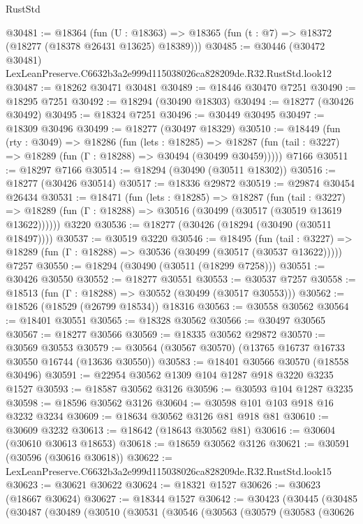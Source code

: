 \begin{lexlean}{RustStd}
\begin{coremodule}
@30481 := @18364
    (fun (U : @18363) => @18365 (fun (t : @7) => @18372 (@18277 (@18378 @26431 @13625) @18389)))
@30485 := @30446
    (@30472 @30481)
    LexLeanPreserve.C6632b3a2e999d115038026ca828209de.R32.RustStd.look12
@30487 := @18262 @30471 @30481
@30489 := @18446 @30470 @7251
@30490 := @18295 @7251
@30492 := @18294 (@30490 @18303)
@30494 := @18277 (@30426 @30492)
@30495 := @18324 @7251
@30496 := @30449 @30495
@30497 := @18309 @30496
@30499 := @18277 (@30497 @18329)
@30510 := @18449
    (fun (rty : @3049) =>
    @18286
      (fun (lets : @18285) =>
      @18287 (fun (tail : @3227) => @18289 (fun (Γ : @18288) => @30494 (@30499 @30459)))))
    @7166
@30511 := @18297 @7166
@30514 := @18294 (@30490 (@30511 @18302))
@30516 := @18277 (@30426 @30514)
@30517 := @18336 @29872
@30519 := @29874 @30454 @26434
@30531 := @18471
    (fun (lets : @18285) =>
    @18287
      (fun (tail : @3227) =>
      @18289 (fun (Γ : @18288) => @30516 (@30499 (@30517 (@30519 @13619 @13622))))))
    @3220
@30536 := @18277 (@30426 (@18294 (@30490 (@30511 @18497))))
@30537 := @30519 @3220
@30546 := @18495
    (fun (tail : @3227) => @18289 (fun (Γ : @18288) => @30536 (@30499 (@30517 (@30537 @13622)))))
    @7257
@30550 := @18294 (@30490 (@30511 (@18299 @7258)))
@30551 := @30426 @30550
@30552 := @18277 @30551
@30553 := @30537 @7257
@30558 := @18513 (fun (Γ : @18288) => @30552 (@30499 (@30517 @30553)))
@30562 := @18526 (@18529 (@26799 @18534)) @18316
@30563 := @30558 @30562
@30564 := @18401 @30551
@30565 := @18328 @30562
@30566 := @30497 @30565
@30567 := @18277 @30566
@30569 := @18335 @30562 @29872
@30570 := @30569 @30553
@30579 := @30564 (@30567 @30570) (@13765 @16737 @16733 @30550 @16744 (@13636 @30550))
@30583 := @18401 @30566 @30570 (@18558 @30496)
@30591 := @22954 @30562 @1309 @104 @1287 @918 @3220 @3235 @1527
@30593 := @18587 @30562 @3126
@30596 := @30593 @104 @1287 @3235
@30598 := @18596 @30562 @3126
@30604 := @30598 @101 @103 @918 @16 @3232 @3234
@30609 := @18634 @30562 @3126 @81 @918 @81
@30610 := @30609 @3232
@30613 := @18642 (@18643 @30562 @81)
@30616 := @30604 (@30610 @30613 @18653)
@30618 := @18659 @30562 @3126
@30621 := @30591 (@30596 (@30616 @30618))
@30622 := LexLeanPreserve.C6632b3a2e999d115038026ca828209de.R32.RustStd.look15
@30623 := @30621 @30622
@30624 := @18321 @1527
@30626 := @30623 (@18667 @30624)
@30627 := @18344 @1527
@30642 := @30423
    (@30445
      (@30485
        (@30487
          (@30489
            (@30510
              (@30531
                (@30546
                  (@30563
                    (@30579
                      (@30583
                        (@30626

\end{coremodule}
\end{lexlean}
